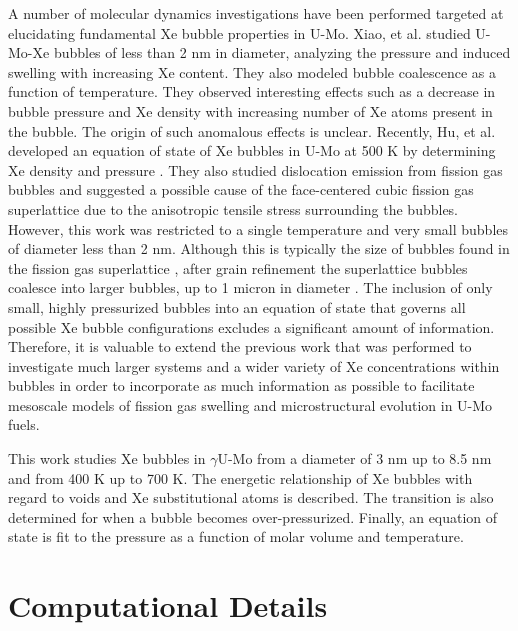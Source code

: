 \documentclass[review]{elsarticle}
\begin{document}
A number of molecular dynamics investigations have been performed targeted at elucidating fundamental Xe bubble properties in U-Mo. Xiao, et al. \cite{xiao2014, xiao2015} studied U-Mo-Xe bubbles of less than 2 nm in diameter, analyzing the pressure and induced swelling with increasing Xe content. They also modeled bubble coalescence as a function of temperature. They observed interesting effects such as a decrease in bubble pressure and Xe density with increasing number of Xe atoms present in the bubble. The origin of such anomalous effects is unclear. Recently, Hu, et al. developed an equation of state of Xe bubbles in U-Mo at 500 K by determining Xe density and pressure \cite{hu2017}. They also studied dislocation emission from fission gas bubbles and suggested a possible cause of the face-centered cubic fission gas superlattice due to the anisotropic tensile stress surrounding the bubbles. However, this work was restricted to a single temperature and very small bubbles of diameter less than 2 nm. Although this is typically the size of bubbles found in the fission gas superlattice \cite{kim2011}, after grain refinement the superlattice bubbles coalesce into larger bubbles, up to 1 micron in diameter \cite{afip6report}. The inclusion of only small, highly pressurized bubbles into an equation of state that governs all possible Xe bubble configurations excludes a significant amount of information. Therefore, it is valuable to extend the previous work that was performed to investigate much larger systems and a wider variety of Xe concentrations within bubbles in order to incorporate as much information as possible to facilitate mesoscale models of fission gas swelling and microstructural evolution in U-Mo fuels.

This work studies Xe bubbles in $\gamma$U-Mo from a diameter of 3 nm up to 8.5 nm and from 400 K up to 700 K. The energetic relationship of Xe bubbles with regard to voids and Xe substitutional atoms is described. The transition is also determined for when a bubble becomes over-pressurized. Finally, an equation of state is fit to the pressure as a function of molar volume and temperature.

\section{Computational Details}
\end{document}
